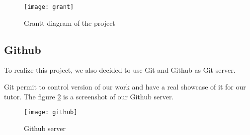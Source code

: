 \begin{figure}[h]
  \centering
  \texttt{[image: grant]}
  \caption{Grantt diagram of the project}
  \label{fig:grantt}
\end{figure}


\subsection{Github}

To realize this project, we also decided to use Git and Github as Git server. ~\\


Git permit to control version of our work and have a real showcase of it for our tutor. The figure
\ref{fig:github} is a screenshot of our Github server.

\begin{figure}[h]
  \centering
  \texttt{[image: github]}
  \caption{Github server}
  \label{fig:github}
\end{figure}




